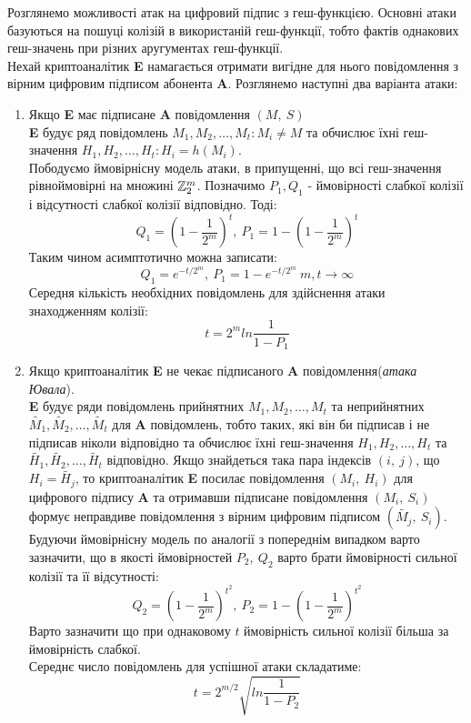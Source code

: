 Розглянемо можливості атак на цифровий підпис з геш-функцією. Основні атаки базуються на пошуці колізій в використаній геш-функції, тобто фактів однакових геш-значень при різних аругументах геш-функції.\\
Нехай криптоаналітик \textbf{E} намагається отримати вигідне для нього повідомлення з вірним цифровим підписом абонента \textbf{A}. Розглянемо наступні два варіанта атаки:
\begin{enumerate}
\item Якщо \textbf{E} має підписане \textbf{A} повідомлення \( (M,\ S) \)\\
\textbf{E} будує ряд повідомлень \( M_1, M_2, \dots, M_t\colon M_i \neq M \) та обчислює їхні геш-значення \( H_1, H_2, \dots, H_t\colon H_i = h(M_i) \).\\
Пободуємо ймовірнісну модель атаки, в припущенні, що всі геш-значення рівноймовірні на множині \( \mathbb Z_{2}^m \). Позначимо \( P_1, Q_1 \) - ймовірності слабкої колізії і відсутності слабкої колізії відповідно. Тоді:
\[ Q_1 = \left(1-\frac{1}{2^m} \right)^t,\ P_1 = 1 - \left(1-\frac{1}{2^m} \right)^t \]
Таким чином асимптотично можна записати:
\[ Q_1 = e^{-t/2^m},\ P_1 = 1-e^{-t/2^m}\ m,t\rightarrow \infty \]
Середня кількість необхідних повідомлень для здійснення атаки знаходженням колізії:
\[ t = 2^m ln\frac{1}{1-P_1} \]
\item Якщо криптоаналітик \textbf{E} не чекає підписаного \textbf{A} повідомлення(\textit{атака Ювала}).\\
\textbf{E} будує ряди повідомлень прийнятних \( M_1, M_2, \dots, M_t \) та неприйнятних \( \widetilde{M_1}, \widetilde{M_2}, \dots, \widetilde{M_t} \) для \textbf{A} повідомлень, тобто таких, які він би підписав і не підписав ніколи відповідно та обчислює їхні геш-значення \( H_1, H_2, \dots, H_t \) та \( \widetilde{H_1}, \widetilde{H_2}, \dots, \widetilde{H_t} \) відповідно. Якщо знайдеться така пара індексів \( (i,\ j) \), що \( H_i = \widetilde{H_j} \), то криптоаналітик \textbf{E} посилає повідомлення \( (M_i,\ H_i) \) для цифрового підпису \textbf{A} та отримавши підписане повідомлення \( (M_i,\ S_i) \) формує неправдиве повідомлення з вірним цифровим підписом \( \left( \widetilde{M_j},\ S_i \right) \).\\
Будуючи ймовірнісну модель по аналогії з попереднім випадком варто зазначити, що в якості ймовірностей \( P_2,\ Q_2 \) варто брати ймовірності сильної колізії та її відсутності:
\[ Q_2 = \left(1-\frac{1}{2^m} \right)^{t^2},\ P_2 = 1 - \left(1-\frac{1}{2^m} \right)^{t^2} \]
Варто зазначити що при однаковому \( t \) ймовірність сильної колізії більша за ймовірність слабкої. \\
Середнє число повідомлень для успішної атаки складатиме:
\[ t = 2^{m/2} \sqrt{ln\frac{1}{1-P_2}} \]
\end{enumerate}
